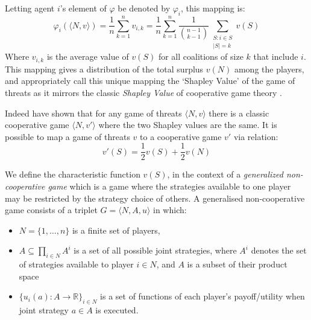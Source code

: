 \documentclass[
10pt, %
a4paper, %
oneside, %
headinclude,footinclude, %
BCOR5mm, %
]{scrartcl}
\begin{document}
Letting agent $i$'s element of $\varphi$ be denoted by $\varphi_i$, this mapping is:
\begin{equation}\label{da_value_eq} 
\varphi_i(\langle N,v\rangle)
= \frac{1}{n}\sum_{k=1}^n v_{i,k} 
= \frac{1}{n}\sum_{k=1}^n \frac{1}{\binom{n-1}{k-1}} \sum_{\substack{S:i\in S \\ |S|=k}}v(S) 
\end{equation}
Where $v_{i,k}$ is the average value of $v(S)$ for all coalitions of size $k$ that include $i$.
This mapping gives a distribution of the total surplus $v(N)$ among the players, and \cite{KOHLBERG2018139} appropriately call this unique mapping the `Shapley Value' of the game of threats as it mirrors the classic \textit{Shapley Value} of cooperative game theory \cite{Shapley1953a}.

Indeed \cite{KOHLBERG2018139} have shown that for any game of threats $\langle N,v\rangle$ there is a classic cooperative game $\langle N,v'\rangle$ where the two Shapley values are the same.
It is possible to map a game of threats $v$ to a cooperative game $v'$ via relation:
\begin{equation}\label{convert1}
v'(S)=\frac{1}{2}v(S)+\frac{1}{2}v(N)
\end{equation}


We define the characteristic function $v(S)$, in the context of a \textit{generalized non-cooperative game} which is a game where the strategies available to one player may be restricted by the strategy choice of others.
A generalised non-cooperative game consists of a triplet $G = \langle N,A,u \rangle$ in which:
\begin{itemize}
\item	$N=\{1,\dots,n\}$ is a finite set of players,
\item	$A\subseteq \prod_{i\in N}A^i$ is a set of all possible joint strategies, where $A^i$ denotes the set of strategies available to player $i\in N$, and $A$ is a subset of their product space
\item	$\{u_i(a) : A\rightarrow \mathbb{R}\}_{i\in N}$ is a set of functions of each player's payoff/utility when joint strategy $a\in A$ is executed.
\end{itemize}
\end{document}
